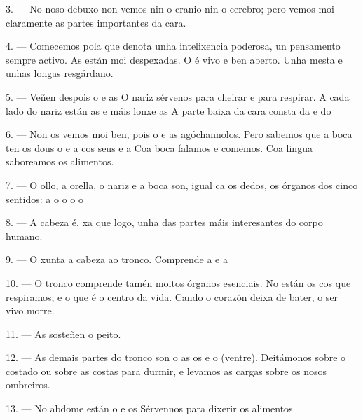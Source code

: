 3. --- No noso debuxo non vemos nin o cranio nin o cerebro; pero vemos moi claramente as
partes importantes da cara.

4. --- Comecemos pola  que denota unha intelixencia poderosa, un pensamento
sempre activo. As  están moi despexadas. O  é vivo e ben aberto.
Unha  mesta e unhas  longas resgárdano.

5. --- Veñen despois o  e as  O nariz sérvenos para cheirar e
para respirar. A cada lado do nariz están as  e máis lonxe as
 A parte baixa da cara consta da  e do

6. --- Non os vemos moi ben, pois o  e as  agóchannolos. Pero
sabemos que a boca ten os dous  o  e a  cos
seus  e a  Coa boca falamos e comemos. Coa lingua saboreamos
os alimentos.

7. --- O ollo, a orella, o nariz e a boca son, igual ca os dedos, os órganos dos cinco
sentidos: a  o  o  o
 o 

8. --- A cabeza é, xa que logo, unha das partes máis interesantes do corpo humano.

\VUsaut{4.4mm}
\VUsaut{3.0mm}

9. --- O  xunta a cabeza ao tronco. Comprende a  e a

10. --- O tronco comprende tamén moitos órganos esenciais. No  están os
 cos que respiramos, e o  que é o centro da vida. Cando o
corazón deixa de bater, o ser vivo morre.

11. --- As  sosteñen o peito.

12. --- As demais partes do tronco son o  as  os
 e o  (ventre). Deitámonos sobre o costado ou sobre
as costas para durmir, e levamos as cargas sobre os nosos ombreiros.

13. --- No abdome están o  e os  Sérvennos para dixerir
os alimentos.

